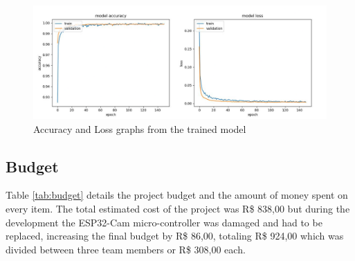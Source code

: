 \documentclass[a4paper,11pt]{article}
\begin{document}
\begin{figure}[H]
  \centering
  \includegraphics[width=12.5cm]{Figures/training_result.png}
  \caption{\small{Accuracy and Loss graphs from the trained model}}
  \label{fig:training_model}
\end{figure}

\subsection{Budget}
Table \ref{tab:budget} details the project budget and the amount of money spent on every item. The total estimated cost of the project was R\$ 838,00 but during the development the ESP32-Cam micro-controller was damaged and had to be replaced, increasing the final budget by R\$ 86,00, totaling R\$ 924,00 which was divided between three team members or R\$ 308,00 each.
\end{document}
